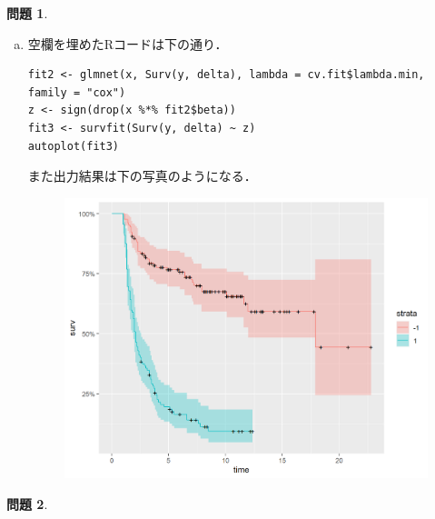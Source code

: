 \documentclass[titlepage]{jsarticle}
\theoremstyle{definition}
\newtheorem{Ex}{問題}
\theoremstyle{mystyle} %
\renewcommand{\footnotesize}{\normalsize}
\begin{document}
\begin{Ex}
\begin{enumerate}[(a)]
\item 空欄を埋めたRコードは下の通り．
\begin{lstlisting}[basicstyle = \ttfamily\footnotesize, frame = single]
fit2 <- glmnet(x, Surv(y, delta), lambda = cv.fit$lambda.min, family = "cox")
z <- sign(drop(x %*% fit2$beta))
fit3 <- survfit(Surv(y, delta) ~ z)
autoplot(fit3)
\end{lstlisting}
また出力結果は下の写真のようになる．
\begin{figure}[H]
 \centering
 \includegraphics[keepaspectratio, scale=0.7]{kaplanmeiyercurv.png}
\end{figure}

\end{enumerate}
\end{Ex}
\begin{Ex}

\end{Ex}
\end{document}
